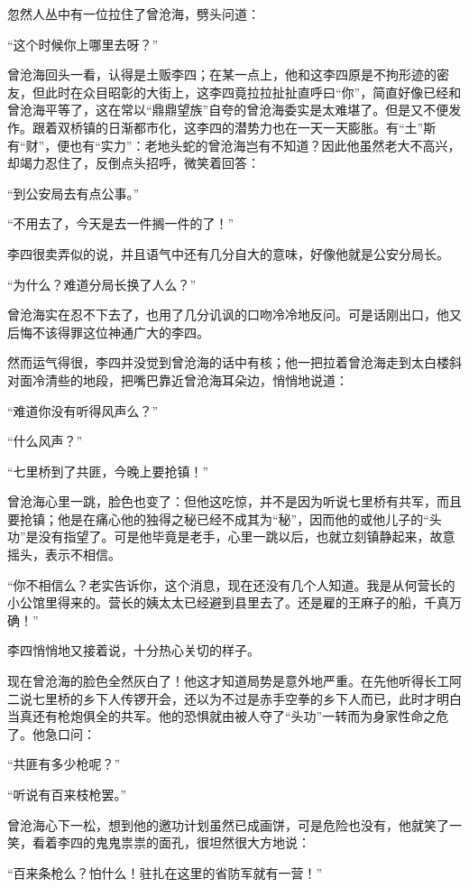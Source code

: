 \par 忽然人丛中有一位拉住了曾沧海，劈头问道：
\par “这个时候你上哪里去呀？”
\par 曾沧海回头一看，认得是土贩李四；在某一点上，他和这李四原是不拘形迹的密友，但此时在众目昭彰的大街上，这李四竟拉拉扯扯直呼曰“你”，简直好像已经和曾沧海平等了，这在常以“鼎鼎望族”自夸的曾沧海委实是太难堪了。但是又不便发作。跟着双桥镇的日渐都市化，这李四的潜势力也在一天一天膨胀。有“土”斯有“财”，便也有“实力”：老地头蛇的曾沧海岂有不知道？因此他虽然老大不高兴，却竭力忍住了，反倒点头招呼，微笑着回答：
\par “到公安局去有点公事。”
\par “不用去了，今天是去一件搁一件的了！”
\par 李四很卖弄似的说，并且语气中还有几分自大的意味，好像他就是公安分局长。
\par “为什么？难道分局长换了人么？”
\par 曾沧海实在忍不下去了，也用了几分讥讽的口吻冷冷地反问。可是话刚出口，他又后悔不该得罪这位神通广大的李四。
\par 然而运气得很，李四并没觉到曾沧海的话中有核；他一把拉着曾沧海走到太白楼斜对面冷清些的地段，把嘴巴靠近曾沧海耳朵边，悄悄地说道：
\par “难道你没有听得风声么？”
\par “什么风声？”
\par “七里桥到了共匪，今晚上要抢镇！”
\par 曾沧海心里一跳，脸色也变了：但他这吃惊，并不是因为听说七里桥有共军，而且要抢镇；他是在痛心他的独得之秘已经不成其为“秘”，因而他的或他儿子的“头功”是没有指望了。可是他毕竟是老手，心里一跳以后，也就立刻镇静起来，故意摇头，表示不相信。
\par “你不相信么？老实告诉你，这个消息，现在还没有几个人知道。我是从何营长的小公馆里得来的。营长的姨太太已经避到县里去了。还是雇的王麻子的船，千真万确！”
\par 李四悄悄地又接着说，十分热心关切的样子。
\par 现在曾沧海的脸色全然灰白了！他这才知道局势是意外地严重。在先他听得长工阿二说七里桥的乡下人传锣开会，还以为不过是赤手空拳的乡下人而已，此时才明白当真还有枪炮俱全的共军。他的恐惧就由被人夺了“头功”一转而为身家性命之危了。他急口问：
\par “共匪有多少枪呢？”
\par “听说有百来枝枪罢。”
\par 曾沧海心下一松，想到他的邀功计划虽然已成画饼，可是危险也没有，他就笑了一笑，看着李四的鬼鬼祟祟的面孔，很坦然很大方地说：
\par “百来条枪么？怕什么！驻扎在这里的省防军就有一营！”
